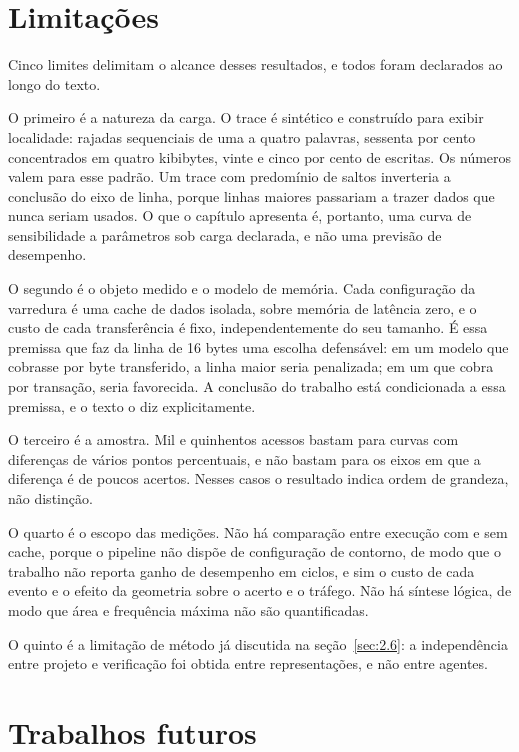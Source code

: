 \section{Limitações}\label{sec:7.3}

Cinco limites delimitam o alcance desses resultados, e todos foram declarados ao longo do texto.

O primeiro é a natureza da carga. O trace é sintético e construído para exibir localidade: rajadas sequenciais de uma a quatro palavras, sessenta por cento concentrados em quatro kibibytes, vinte e cinco por cento de escritas. Os números valem para esse padrão. Um trace com predomínio de saltos inverteria a conclusão do eixo de linha, porque linhas maiores passariam a trazer dados que nunca seriam usados. O que o capítulo apresenta é, portanto, uma curva de sensibilidade a parâmetros sob carga declarada, e não uma previsão de desempenho.

O segundo é o objeto medido e o modelo de memória. Cada configuração da varredura é uma cache de dados isolada, sobre memória de latência zero, e o custo de cada transferência é fixo, independentemente do seu tamanho. É essa premissa que faz da linha de 16 bytes uma escolha defensável: em um modelo que cobrasse por byte transferido, a linha maior seria penalizada; em um que cobra por transação, seria favorecida. A conclusão do trabalho está condicionada a essa premissa, e o texto o diz explicitamente.

O terceiro é a amostra. Mil e quinhentos acessos bastam para curvas com diferenças de vários pontos percentuais, e não bastam para os eixos em que a diferença é de poucos acertos. Nesses casos o resultado indica ordem de grandeza, não distinção.

O quarto é o escopo das medições. Não há comparação entre execução com e sem cache, porque o pipeline não dispõe de configuração de contorno, de modo que o trabalho não reporta ganho de desempenho em ciclos, e sim o custo de cada evento e o efeito da geometria sobre o acerto e o tráfego. Não há síntese lógica, de modo que área e frequência máxima não são quantificadas.

O quinto é a limitação de método já discutida na seção~\ref{sec:2.6}: a independência entre projeto e verificação foi obtida entre representações, e não entre agentes.

\section{Trabalhos futuros}\label{sec:7.4}

